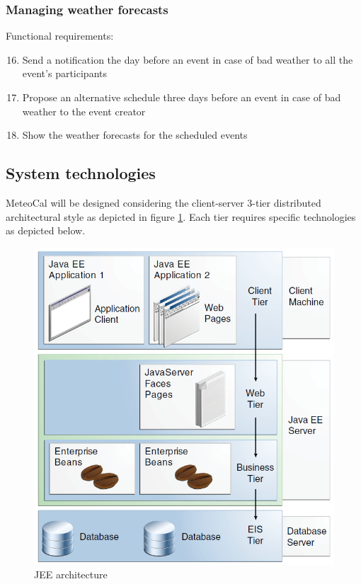 \documentclass[10pt,a4paper,titlepage]{article}
\begin{document}
\subsubsection{Managing weather forecasts}
Functional requirements:
\begin{enumerate}[label = FR \arabic*:]
\setcounter{enumi}{15}
\item Send a notification the day before an event in case of bad weather to all the event's participants
\item Propose an alternative schedule three days before an event in case of bad weather to the event creator
\item Show the weather forecasts for the scheduled events 
\end{enumerate}

\subsection{System technologies}
MeteoCal will be designed considering the client-server 3-tier distributed architectural style as depicted in figure \ref{fig:JEE_arch}. Each tier requires specific technologies as depicted below.
\begin{figure}[ph]
\centering
\includegraphics[width=\linewidth]{./images/JEE-arch}
\caption[jee arch]{JEE architecture}
\label{fig:JEE_arch}
\end{figure}
\end{document}
